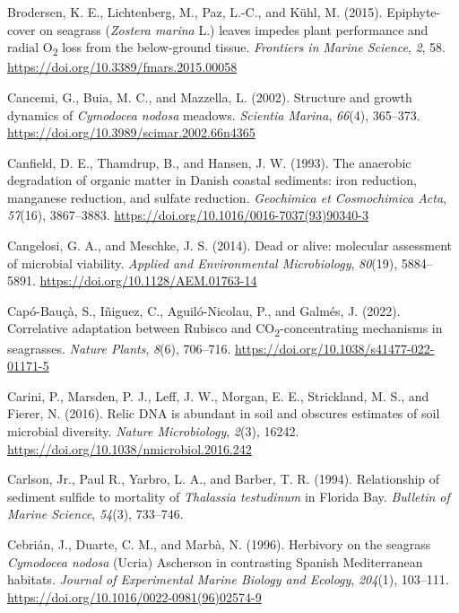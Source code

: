 \documentclass[
  12 pt,
]{book}
\newlength{\cslhangindent}
\newlength{\cslentryspacingunit} %
\newenvironment{CSLReferences}[2] %
 {%
  \setlength{\parindent}{0pt}
  \ifodd #1
  \let\oldpar\par
  \def\par{\hangindent=\cslhangindent\oldpar}
  \fi
  \setlength{\parskip}{#2\cslentryspacingunit}
 }%
 {}
\begin{document}
\begin{CSLReferences}{1}{0}
\leavevmode{}%
Brodersen, K. E., Lichtenberg, M., Paz, L.-C., and Kühl, M. (2015). Epiphyte-cover on seagrass ({{\emph{Zostera marina}}} {L}.) leaves impedes plant performance and radial {O}{\textsubscript{2}} loss from the below-ground tissue. \emph{Frontiers in Marine Science}, \emph{2}, 58. \url{https://doi.org/10.3389/fmars.2015.00058}

\leavevmode{}%
Cancemi, G., Buia, M. C., and Mazzella, L. (2002). Structure and growth dynamics of {{\emph{Cymodocea nodosa}}} meadows. \emph{Scientia Marina}, \emph{66}(4), 365--373. \url{https://doi.org/10.3989/scimar.2002.66n4365}

\leavevmode{}%
Canfield, D. E., Thamdrup, B., and Hansen, J. W. (1993). The anaerobic degradation of organic matter in {Danish} coastal sediments: iron reduction, manganese reduction, and sulfate reduction. \emph{Geochimica et Cosmochimica Acta}, \emph{57}(16), 3867--3883. \url{https://doi.org/10.1016/0016-7037(93)90340-3}

\leavevmode{}%
Cangelosi, G. A., and Meschke, J. S. (2014). Dead or alive: molecular assessment of microbial viability. \emph{Applied and Environmental Microbiology}, \emph{80}(19), 5884--5891. \url{https://doi.org/10.1128/AEM.01763-14}

\leavevmode{}%
Capó-Bauçà, S., Iñiguez, C., Aguiló-Nicolau, P., and Galmés, J. (2022). Correlative adaptation between {Rubisco} and {CO}{\textsubscript{2}}-concentrating mechanisms in seagrasses. \emph{Nature Plants}, \emph{8}(6), 706--716. \url{https://doi.org/10.1038/s41477-022-01171-5}

\leavevmode{}%
Carini, P., Marsden, P. J., Leff, J. W., Morgan, E. E., Strickland, M. S., and Fierer, N. (2016). Relic {DNA} is abundant in soil and obscures estimates of soil microbial diversity. \emph{Nature Microbiology}, \emph{2}(3), 16242. \url{https://doi.org/10.1038/nmicrobiol.2016.242}

\leavevmode{}%
Carlson, Jr., Paul R., Yarbro, L. A., and Barber, T. R. (1994). Relationship of sediment sulfide to mortality of {{{\emph{Thalassia testudinum}}} in Florida Bay}. \emph{Bulletin of Marine Science}, \emph{54}(3), 733--746.

\leavevmode{}%
Cebrián, J., Duarte, C. M., and Marbà, N. (1996). Herbivory on the seagrass {{{\emph{Cymodocea nodosa}}} (Ucria) Ascherson in contrasting Spanish Mediterranean habitats}. \emph{Journal of Experimental Marine Biology and Ecology}, \emph{204}(1), 103--111. \url{https://doi.org/10.1016/0022-0981(96)02574-9}


\end{CSLReferences}
\end{document}
